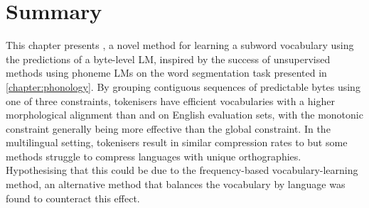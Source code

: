 

\section{Summary}

This chapter presents \bytespan, a novel method for learning a subword vocabulary using the predictions of a byte-level LM, inspired by the success of unsupervised methods using phoneme LMs on the word segmentation task presented in \cref{chapter:phonology}. By grouping contiguous sequences of predictable bytes using one of three constraints, \bytespan tokenisers have efficient vocabularies with a higher morphological alignment than \bpe and \bpewp on English evaluation sets, with the monotonic constraint generally being more effective than the global constraint. In the multilingual setting, \bytespan tokenisers result in similar compression rates to \bpe but some methods struggle to compress languages with unique orthographies. Hypothesising that this could be due to the frequency-based vocabulary-learning method, an alternative method that balances the vocabulary by language was found to counteract this effect.

